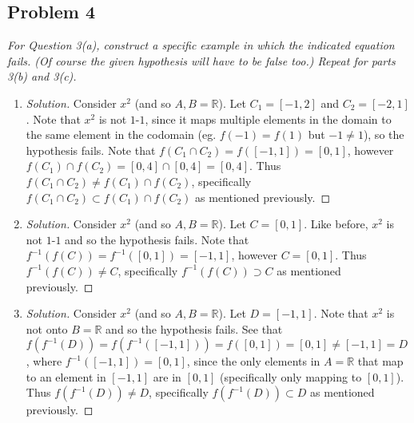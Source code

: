 \documentclass{article}
\newcommand{\R}{{\mathbb R}}
\begin{document}
\subsection*{Problem 4}
{\it For Question 3(a), construct a specific example
in which the indicated equation fails.
(Of course the given hypothesis will have to be false too.)
Repeat for parts 3(b) and 3(c).}
\begin{enumerate}
\item \begin{proof}[Solution]\let\qed\relax
Consider $x^2$ (and so $A,B = \R$).
Let $C_1 = [-1,2]$ and $C_2 = [-2,1]$.
Note that $x^2$ is not $1$-$1$, since it maps multiple elements in the domain
to the same element in the codomain (eg. $f(-1)=f(1)$ but $-1\neq 1$),
so the hypothesis fails.
Note that $f(C_1 \cap C_2) = f([-1,1]) = [0,1]$,
however $f(C_1) \cap f(C_2) = [0,4] \cap [0,4] = [0,4]$.
Thus $f(C_1 \cap C_2) \neq f(C_1) \cap f(C_2)$,
specifically $f(C_1 \cap C_2) \subset f(C_1) \cap f(C_2)$ as mentioned previously.
\end{proof}
\item \begin{proof}[Solution]\let\qed\relax
Consider $x^2$ (and so $A,B = \R$).
Let $C = [0,1]$.
Like before, $x^2$ is not $1$-$1$ and so the hypothesis fails.
Note that $f^{-1}(f(C)) = f^{-1}([0,1]) = [-1,1]$,
however $C = [0,1]$.
Thus $f^{-1}(f(C)) \neq C$, specifically $f^{-1}(f(C))\supset C$ as mentioned previously.
\end{proof}
\item \begin{proof}[Solution]\let\qed\relax
Consider $x^2$ (and so $A,B = \R$).
Let $D = [-1,1]$.
Note that $x^2$ is not onto $B = \R$ and so the hypothesis fails.
See that $f(f^{-1}(D)) = f(f^{-1}([-1,1])) = f([0,1]) = [0,1] \neq [-1,1] = D$,
where $f^{-1}([-1,1]) = [0,1]$, since the only elements in $A = \R$ that map to an element in $[-1,1]$
are in $[0,1]$ (specifically only mapping to $[0,1]$).
Thus $f(f^{-1}(D)) \neq D$, specifically $f(f^{-1}(D))\subset D$ as mentioned previously.
\end{proof}
\end{enumerate}
\clearpage
\end{document}
